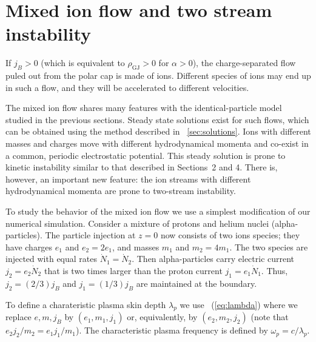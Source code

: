 \section{Mixed ion flow and two stream instability}


If $j_B>0$ (which is equivalent to $\rho_\mathrm{GJ}>0$ for $\alpha>0$), the
charge-separated flow puled out from the polar cap is made of ions.
Different species of ions may end up in such a flow, and they will be
accelerated to different velocities.

The mixed ion flow shares many features with the identical-particle model
studied in the previous sections. Steady state solutions exist for such flows,
which can be obtained using the method described in \Sect~\ref{sec:solutions}.
Ions with different masses and charges move with different hydrodynamical
momenta and co-exist in a common, periodic electrostatic potential.
This steady solution
is prone to kinetic instability similar to that described in Sections~2 and 4.
%
There is, however, an important new feature: the ion streams with
different hydrodynamical momenta are prone to two-stream instability.

To study the behavior of the mixed ion flow we use a simplest modification of
our numerical simulation. Consider a mixture of protons and helium nuclei
(alpha-particles).
The particle injection at $z=0$ now consists of two ions species; they have
charges $e_1$ and $e_2=2e_1$, and masses $m_1$ and $m_2=4m_1$.
The two species are injected with equal rates $\dot{N}_1=\dot{N}_2$.
Then alpha-particles carry electric current $j_2=e_2\dot{N}_2$ that is
two times larger than the proton current $j_1=e_1\dot{N}_1$. Thus,
$j_2=(2/3)j_B$ and $j_1=(1/3)j_B$ are maintained at the boundary.

To define a charateristic plasma skin depth $\lambda_p$ we use
\Eq~(\ref{eq:lambda}) where we replace $e,m,j_B$ by $(e_1,m_1,j_1)$
or, equivalently, by $(e_2,m_2,j_2)$ (note that $e_2j_2/m_2=e_1j_1/m_1$).
The characteristic plasma frequency is defined by $\omega_p=c/\lambda_p$.


